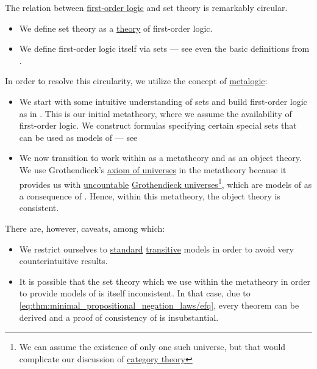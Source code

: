 \begin{remark}\label{rem:set_definition_recursion}
  The relation between \hyperref[subsec:first_order_logic]{first-order logic} and set theory is remarkably circular.

  \begin{itemize}
    \item We define set theory as a \hyperref[def:first_order_theory]{theory} of first-order logic.

    \item We define first-order logic itself via sets --- see even the basic definitions from .
  \end{itemize}

  In order to resolve this circularity, we utilize the concept of \hyperref[rem:metalogic]{metalogic}:
  \begin{itemize}
    \item We start with some intuitive understanding of sets and build first-order logic as in . This is our initial metatheory, where we assume the availability of first-order logic. We construct formulas specifying certain special sets that can be used as models of  --- see 

    \item We now transition to work within  as a metatheory and  as an object theory. We use Grothendieck's \hyperref[def:axiom_of_universes]{axiom of universes} in the metatheory because it provides us with \hyperref[def:set_countability/uncountable]{uncountable} \hyperref[def:grothendieck_universe]{Grothendieck universes}\footnote{We can assume the existence of only one such universe, but that would complicate our discussion of \hyperref[sec:category_theory]{category theory}}, which are models of  as a consequence of . Hence, within this metatheory, the object theory  is consistent.
  \end{itemize}

  There are, however, caveats, among which:
  \begin{itemize}
    \item We restrict ourselves to \hyperref[rem:standard_model_of_set_theory]{standard} \hyperref[rem:transitive_model_of_set_theory]{transitive} models in order to avoid very counterintuitive results.

    \item It is possible that the set theory which we use within the metatheory in order to provide models of  is itself inconsistent. In that case, due to \eqref{eq:thm:minimal_propositional_negation_laws/efq}, every theorem can be derived and a proof of consistency of  is insubstantial.
  \end{itemize}
\end{remark}

